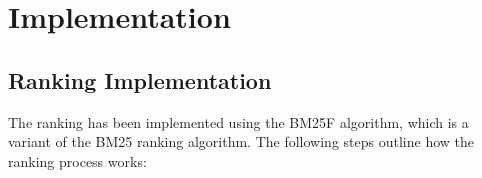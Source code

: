 \documentclass{article}
\begin{document}

\section{Implementation}
\subsection{Ranking Implementation}

The ranking has been implemented using the BM25F algorithm, which is a variant of the BM25 ranking algorithm. The following steps outline how the ranking process works:
\end{document}
